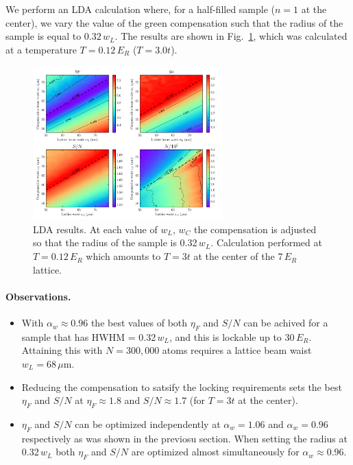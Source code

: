 \documentclass[11pt,letter]{article}
\newcommand{\awaist}{\ensuremath{ \alpha_{w} }}
\begin{document}
We perform an LDA calculation where, for a half-filled sample ($n=1$ at the
center), we vary the value of the green compensation such that the radius of
the sample is  equal to $0.32\,w_{L}$.  The results are shown in
Fig.~\ref{fig:optimize_lock},  which was calculated at a temperature
$T=0.12\,E_{R}$ ($T=3.0t$).    
\begin{figure}
    \centering
\includegraphics[width=0.65\textwidth]{figures_hubbard-lda/etaF-wIRwGR_r032.png}
\caption{LDA results. At each value of $w_{L}$, $w_{C}$ the compensation is
adjusted so that the radius of the sample is 0.32\,$w_{L}$. Calculation
performed at $T=0.12\,E_{R}$ which amounts to $T=3t$ at the center of the
7\,$E_{R}$ lattice.}
    \label{fig:optimize_lock}
\end{figure}

\paragraph{Observations.}
\begin{itemize}
\item With $\awaist\approx 0.96$ the best values of both $\eta_{F}$ and $S/N$
can be achived for a sample that has HWHM = 0.32\,$w_{L}$, and this is lockable
up to 30\,$E_{R}$.   Attaining this with $N=300,000$ atoms requires a lattice
beam waist $w_{L}=68\,\mu$m. 

\item  Reducing the compensation to satsify the locking requirements sets the
best  $\eta_{F}$ and $S/N$ at $\eta_{F} \approx 1.8$ and $S/N\approx 1.7$ (for
$T=3t$ at the center).   

\item  $\eta_{F}$ and $S/N$ can be optimized independently at $\awaist = 1.06$
and $\awaist = 0.96$ respectively as was shown in the previosu section.   When
setting the radius at 0.32\,$w_{L}$ both $\eta_{F}$ and $S/N$ are optimized
almost simultaneously for $\awaist \approx 0.96$. 

\end{itemize}
\end{document}

